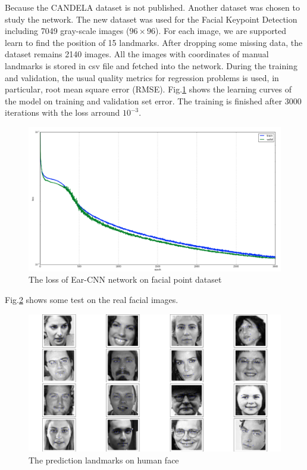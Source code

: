 Because the CANDELA dataset is not published. Another dataset was chosen to study the network. The new dataset was used for the Facial Keypoint Detection including 7049 gray-scale images ($96 \times 96$). For each image, we are supported learn to find the position of 15 landmarks. After dropping some missing data, the dataset remains 2140 images. All the images with coordinates of manual landmarks is stored in csv file and fetched into the network. During the training and validation, the usual quality metrics for regression problems is used, in particular, root mean square error (RMSE). Fig.\ref{earLosstrain} shows the learning curves of the model on training and validation set error. The training is finished after 3000 iterations with the loss arround $10^{-3}$.
\begin{figure}[h!]
	\centering
	\includegraphics[scale=0.27]{images/trainloss}
	\caption{The loss of Ear-CNN network on facial point dataset}
	\label{earLosstrain}
\end{figure}
Fig.\ref{earTest} shows some test on the real facial images.
\begin{figure}[h!]
	\centering
	\includegraphics[scale=0.27]{images/figure_1-1.png}
	\caption{The prediction landmarks on human face}
	\label{earTest}
\end{figure}
